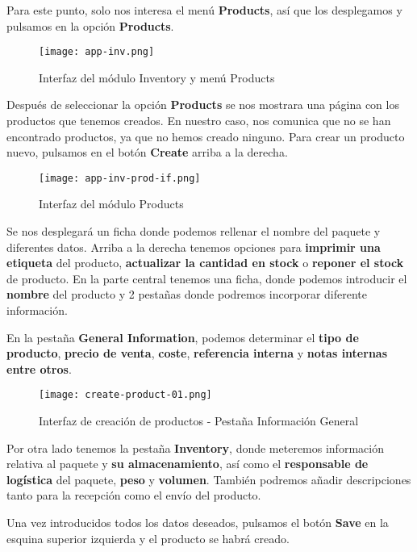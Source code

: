 Para este punto, solo nos interesa el menú \textbf{Products}, así que los desplegamos y pulsamos en la opción \textbf{Products}.

\begin{figure}[h]
    \centering
    \texttt{[image: app-inv.png]}
    \caption{Interfaz del módulo Inventory y menú Products}
\end{figure}

\vspace{3ex}

Después de seleccionar la opción \textbf{Products} se nos mostrara una página con los productos que tenemos creados. En nuestro caso, nos comunica que no se han encontrado productos, ya que no hemos creado ninguno. Para crear un producto nuevo, pulsamos en el botón \textbf{Create} arriba a la derecha.

\begin{figure}[h]
    \centering
    \texttt{[image: app-inv-prod-if.png]}
    \caption{Interfaz del módulo Products}
\end{figure}

Se nos desplegará un ficha donde podemos rellenar el nombre del paquete y diferentes datos. Arriba a la derecha tenemos opciones para \textbf{imprimir una etiqueta} del producto, \textbf{actualizar la cantidad en stock} o \textbf{reponer el stock} de producto. En la parte central tenemos una ficha, donde podemos introducir el \textbf{nombre} del producto y 2 pestañas donde podremos incorporar diferente información.

En la pestaña \textbf{General Information}, podemos determinar el \textbf{tipo de producto}, \textbf{precio de venta}, \textbf{coste}, \textbf{referencia interna} y \textbf{notas internas entre otros}.

\begin{figure}[h]
    \centering
    \texttt{[image: create-product-01.png]}
    \caption{Interfaz de creación de productos - Pestaña Información General}
\end{figure}

Por otra lado tenemos la pestaña \textbf{Inventory}, donde meteremos información relativa al paquete y \textbf{su almacenamiento}, así como el \textbf{responsable de logística} del paquete, \textbf{peso} y \textbf{volumen}. También podremos añadir descripciones tanto para la recepción como el envío del producto.

Una vez introducidos todos los datos deseados, pulsamos el botón \textbf{Save} en la esquina superior izquierda y el producto se habrá creado.

